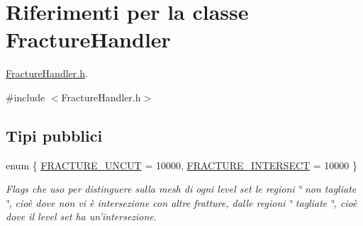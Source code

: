 \hypertarget{classFractureHandler}{\section{Riferimenti per la classe Fracture\-Handler}
\label{classFractureHandler}
}


\hyperlink{FractureHandler_8h}{Fracture\-Handler.\-h}.  




{\ttfamily \#include $<$Fracture\-Handler.\-h$>$}

\subsection*{Tipi pubblici}
\begin{DoxyCompactItemize}
\item 
enum \{ \hyperlink{classFractureHandler_a495ad4fc72d0c47c8f0424842f1153aaaa992cc3ad024a030ecd798dc319c95ac}{F\-R\-A\-C\-T\-U\-R\-E\-\_\-\-U\-N\-C\-U\-T} = 10000, 
\hyperlink{classFractureHandler_a495ad4fc72d0c47c8f0424842f1153aaa781cae3f3b99bf9357fed2833d315537}{F\-R\-A\-C\-T\-U\-R\-E\-\_\-\-I\-N\-T\-E\-R\-S\-E\-C\-T} = 10000
 \}
\begin{DoxyCompactList}\small\item\em Flags che uso per distinguere sulla mesh di ogni level set le regioni \char`\"{} non tagliate \char`\"{}, cioè dove non vi è intersezione con altre fratture, dalle regioni \char`\"{} tagliate \char`\"{}, cioè dove il level set ha un'intersezione. \end{DoxyCompactList}\end{DoxyCompactItemize}
